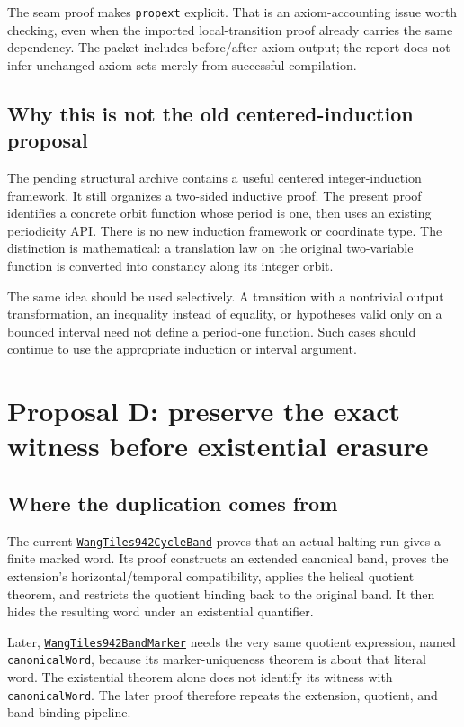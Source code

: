 \documentclass[11pt,letterpaper]{article}
\newcommand{\code}[1]{\nolinkurl{#1}}
\newcommand{\src}[2]{\href{https://github.com/VladimirReshetnikov/ProveIt/blob/1e2a853935a6155cbcf2aa199aaca51946c4fff9/Computability/DiophantineConsistency/Lean/DiophantineConsistency/#1.lean}{\nolinkurl{#2}}}
\begin{document}
The seam proof makes \code{propext} explicit. That is an axiom-accounting issue worth checking, even when the imported local-transition proof already carries the same dependency. The packet includes before/after axiom output; the report does not infer unchanged axiom sets merely from successful compilation.

\subsection{Why this is not the old centered-induction proposal}
The pending structural archive contains a useful centered integer-induction framework. It still organizes a two-sided inductive proof. The present proof identifies a concrete orbit function whose period is one, then uses an existing periodicity API. There is no new induction framework or coordinate type. The distinction is mathematical: a translation law on the original two-variable function is converted into constancy along its integer orbit.

The same idea should be used selectively. A transition with a nontrivial output transformation, an inequality instead of equality, or hypotheses valid only on a bounded interval need not define a period-one function. Such cases should continue to use the appropriate induction or interval argument.

\section{Proposal D: preserve the exact witness before existential erasure}
\subsection{Where the duplication comes from}
The current \src{WangTiles942CycleBand}{WangTiles942CycleBand} proves that an actual halting run gives a finite marked word. Its proof constructs an extended canonical band, proves the extension's horizontal/temporal compatibility, applies the helical quotient theorem, and restricts the quotient binding back to the original band. It then hides the resulting word under an existential quantifier.

Later, \src{WangTiles942BandMarker}{WangTiles942BandMarker} needs the very same quotient expression, named \code{canonicalWord}, because its marker-uniqueness theorem is about that literal word. The existential theorem alone does not identify its witness with \code{canonicalWord}. The later proof therefore repeats the extension, quotient, and band-binding pipeline.
\end{document}
